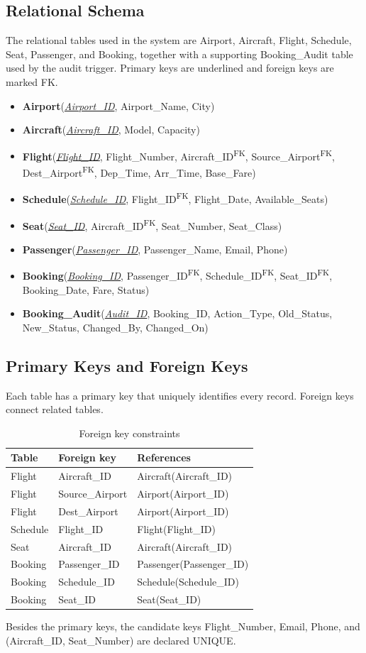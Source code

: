 \documentclass[12pt,a4paper]{article}
\newcommand{\pk}[1]{\textit{\underline{#1}}}
\newcommand{\fk}[1]{#1\textsuperscript{FK}}
\begin{document}
\subsection{Relational Schema}
The relational tables used in the system are Airport, Aircraft, Flight, Schedule, Seat, Passenger, and
Booking, together with a supporting Booking_Audit table used by the audit trigger. Primary keys are
underlined and foreign keys are marked FK.
\begin{itemize}[nosep]
  \item \textbf{Airport}(\pk{Airport_ID}, Airport_Name, City)
  \item \textbf{Aircraft}(\pk{Aircraft_ID}, Model, Capacity)
  \item \textbf{Flight}(\pk{Flight_ID}, Flight_Number, \fk{Aircraft_ID}, \fk{Source_Airport}, \fk{Dest_Airport}, Dep_Time, Arr_Time, Base_Fare)
  \item \textbf{Schedule}(\pk{Schedule_ID}, \fk{Flight_ID}, Flight_Date, Available_Seats)
  \item \textbf{Seat}(\pk{Seat_ID}, \fk{Aircraft_ID}, Seat_Number, Seat_Class)
  \item \textbf{Passenger}(\pk{Passenger_ID}, Passenger_Name, Email, Phone)
  \item \textbf{Booking}(\pk{Booking_ID}, \fk{Passenger_ID}, \fk{Schedule_ID}, \fk{Seat_ID}, Booking_Date, Fare, Status)
  \item \textbf{Booking_Audit}(\pk{Audit_ID}, Booking_ID, Action_Type, Old_Status, New_Status, Changed_By, Changed_On)
\end{itemize}

\subsection{Primary Keys and Foreign Keys}
Each table has a primary key that uniquely identifies every record. Foreign keys connect related tables.
\begin{table}[H]
\centering\small
\begin{tabular}{l l l}
\toprule
\textbf{Table} & \textbf{Foreign key} & \textbf{References}\\
\midrule
Flight   & Aircraft_ID    & Aircraft(Aircraft_ID)\\
Flight   & Source_Airport & Airport(Airport_ID)\\
Flight   & Dest_Airport   & Airport(Airport_ID)\\
Schedule & Flight_ID      & Flight(Flight_ID)\\
Seat     & Aircraft_ID    & Aircraft(Aircraft_ID)\\
Booking  & Passenger_ID   & Passenger(Passenger_ID)\\
Booking  & Schedule_ID    & Schedule(Schedule_ID)\\
Booking  & Seat_ID        & Seat(Seat_ID)\\
\bottomrule
\end{tabular}
\caption{Foreign key constraints}
\end{table}
Besides the primary keys, the candidate keys Flight_Number, Email, Phone, and (Aircraft_ID, Seat_Number)
are declared UNIQUE.
\end{document}
